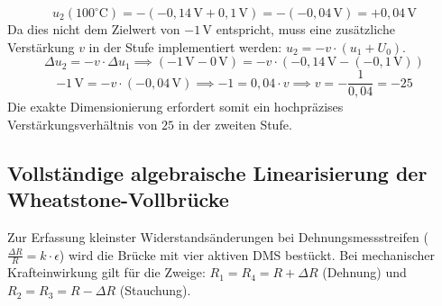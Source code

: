 \documentclass[11pt,a4paper]{article}
\begin{document}
\begin{enumerate}
    \begin{equation}
    u_2(100^\circ\text{C}) = -\left( -0{,}14\,\text{V} + 0{,}1\,\text{V} \right) = -\left( -0{,}04\,\text{V} \right) = +0{,}04\,\text{V}
    \end{equation}
    Da dies nicht dem Zielwert von $-1\,\text{V}$ entspricht, muss eine zusätzliche Verstärkung $v$ in der Stufe implementiert werden: $u_2 = -v \cdot (u_1 + U_0)$.
    \begin{equation}
    \Delta u_2 = -v \cdot \Delta u_1 \implies (-1\,\text{V} - 0\,\text{V}) = -v \cdot (-0{,}14\,\text{V} - (-0{,}1\,\text{V}))
    \end{equation}
    \begin{equation}
    -1\,\text{V} = -v \cdot (-0{,}04\,\text{V}) \implies -1 = 0{,}04 \cdot v \implies v = -\frac{1}{0{,}04} = -25
    \end{equation}
    Die exakte Dimensionierung erfordert somit ein hochpräzises Verstärkungsverhältnis von $25$ in der zweiten Stufe.
\end{enumerate}

\subsection{Vollständige algebraische Linearisierung der Wheatstone-Vollbrücke}
Zur Erfassung kleinster Widerstandsänderungen bei Dehnungsmessstreifen ($\frac{\Delta R}{R} = k \cdot \epsilon$) wird die Brücke mit vier aktiven DMS bestückt. Bei mechanischer Krafteinwirkung gilt für die Zweige: $R_1 = R_4 = R + \Delta R$ (Dehnung) und $R_2 = R_3 = R - \Delta R$ (Stauchung).
\end{document}
